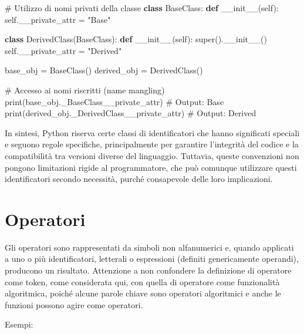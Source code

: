 \documentclass[
  letterpaper,
  DIV=11,
  numbers=noendperiod]{scrreprt}
\newenvironment{Shaded}{\begin{snugshade}}{\end{snugshade}}
\newcommand{\BuiltInTok}[1]{\textcolor[rgb]{0.00,0.23,0.31}{#1}}
\newcommand{\CommentTok}[1]{\textcolor[rgb]{0.37,0.37,0.37}{#1}}
\newcommand{\FunctionTok}[1]{\textcolor[rgb]{0.28,0.35,0.67}{#1}}
\newcommand{\KeywordTok}[1]{\textcolor[rgb]{0.00,0.23,0.31}{\textbf{#1}}}
\newcommand{\NormalTok}[1]{\textcolor[rgb]{0.00,0.23,0.31}{#1}}
\newcommand{\OperatorTok}[1]{\textcolor[rgb]{0.37,0.37,0.37}{#1}}
\newcommand{\StringTok}[1]{\textcolor[rgb]{0.13,0.47,0.30}{#1}}
\newcommand{\VariableTok}[1]{\textcolor[rgb]{0.07,0.07,0.07}{#1}}
\begin{document}
\begin{Shaded}
\begin{Highlighting}[]
\CommentTok{\# Utilizzo di nomi privati della classe}
\KeywordTok{class}\NormalTok{ BaseClass:}
    \KeywordTok{def} \FunctionTok{\_\_init\_\_}\NormalTok{(}\VariableTok{self}\NormalTok{):}
        \VariableTok{self}\NormalTok{.\_\_private\_attr }\OperatorTok{=} \StringTok{"Base"}

\KeywordTok{class}\NormalTok{ DerivedClass(BaseClass):}
    \KeywordTok{def} \FunctionTok{\_\_init\_\_}\NormalTok{(}\VariableTok{self}\NormalTok{):}
        \BuiltInTok{super}\NormalTok{().}\FunctionTok{\_\_init\_\_}\NormalTok{()}
        \VariableTok{self}\NormalTok{.\_\_private\_attr }\OperatorTok{=} \StringTok{"Derived"}

\NormalTok{base\_obj }\OperatorTok{=}\NormalTok{ BaseClass()}
\NormalTok{derived\_obj }\OperatorTok{=}\NormalTok{ DerivedClass()}

\CommentTok{\# Accesso ai nomi riscritti (name mangling)}
\BuiltInTok{print}\NormalTok{(base\_obj.\_BaseClass\_\_private\_attr)  }\CommentTok{\# Output: Base}
\BuiltInTok{print}\NormalTok{(derived\_obj.\_DerivedClass\_\_private\_attr)  }\CommentTok{\# Output: Derived}
\end{Highlighting}
\end{Shaded}

In sintesi, Python riserva certe classi di identificatori che hanno
significati speciali e seguono regole specifiche, principalmente per
garantire l'integrità del codice e la compatibilità tra versioni diverse
del linguaggio. Tuttavia, queste convenzioni non pongono limitazioni
rigide al programmatore, che può comunque utilizzare questi
identificatori secondo necessità, purché consapevole delle loro
implicazioni.

\section{Operatori}\label{operatori}

Gli operatori sono rappresentati da simboli non alfanumerici e, quando
applicati a uno o più identificatori, letterali o espressioni (definiti
genericamente operandi), producono un risultato. Attenzione a non
confondere la definizione di operatore come token, come considerata qui,
con quella di operatore come funzionalità algoritmica, poiché alcune
parole chiave sono operatori algoritmici e anche le funzioni possono
agire come operatori.

Esempi:
\end{document}
